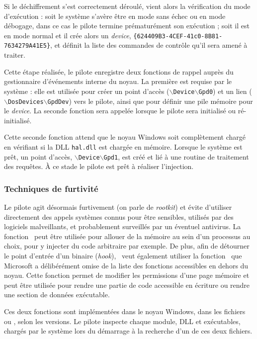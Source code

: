 Si le déchiffrement s'est correctement déroulé, vient alors la vérification du mode d'exécution : soit le système s'avère être en mode sans échec ou en mode débogage, dans ce cas le pilote termine prématurément son exécution ; soit il est en mode normal et il crée alors un \emph{device}, \texttt{\{624409B3-4CEF-41c0-8B81-7634279A41E5\}}, et définit la liste des commandes de contrôle qu'il sera amené à traiter.

Cette étape réalisée, le pilote enregistre deux fonctions de rappel auprès du gestionnaire d'événements interne du noyau.
La première est requise par le système : elle est utilisée pour créer un point d'accès ($\backslash$\texttt{Device}$\backslash$\texttt{Gpd0}) et un lien ($\backslash$\texttt{DosDevices}$\backslash$\texttt{GpdDev}) vers le pilote, ainsi que pour définir une pile mémoire pour le \emph{device}.
La seconde fonction sera appelée lorsque le pilote sera initialisé ou ré-initialisé. 


Cette seconde fonction attend que le noyau Windows soit complètement chargé en vérifiant si la DLL \texttt{hal.dll} est chargée en mémoire. Lorsque le système est prêt, un point d'accès, $\backslash$\texttt{Device}$\backslash$\texttt{Gpd1}, est créé et lié à une routine de traitement des requêtes. 
À ce stade le pilote est prêt à réaliser l'injection.

\subsubsection{Techniques de furtivité}
Le pilote agit désormais furtivement (on parle de \emph{rootkit}) et évite d'utiliser directement des appels systèmes connus pour être sensibles, utilisés par des logiciels malveillants, et probablement surveillés par un éventuel antivirus.
La fonction \ZwA\ peut être utilisée pour allouer de la mémoire au sein d'un processus au choix, pour y injecter du code arbitraire par exemple.
De plus, afin de détourner le point d'entrée d'un binaire (\emph{hook}), \duqu\ veut également utiliser la fonction \ZwP\ que Microsoft a délibérément omise de la liste des fonctions accessibles en dehors du noyau. Cette fonction permet de modifier les permissions d'une page mémoire et peut être utilisée pour rendre une partie de code accessible en écriture ou rendre une section de données exécutable.

Ces deux fonctions sont implémentées dans le noyau Windows, dans les fichiers  ou , selon les versions. 
Le pilote inspecte chaque module, DLL et exécutables, chargés par le système lors du démarrage à la recherche d'un de ces deux fichiers.

